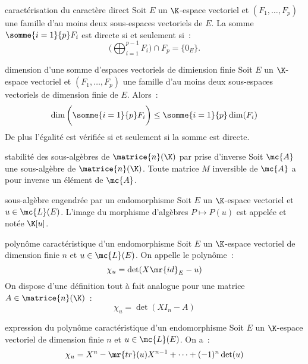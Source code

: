 \begin{adjustwidth}{-3cm}{-3cm}
\begin{proposition}{5.5}{caractérisation du caractère direct}
    Soit $E$ un $\K$-espace vectoriel et $(F_1, \dots , F_p)$ une famille d'au moins deux sous-espaces vectoriels de $E$. La somme $ \displaystyle  \somme{i=1}{p}F_i$ est directe si et seulement si~:
        $$ \bigg( \bigoplus_{i=1}^{p-1} F_i \bigg) \cap F_p = \{0_E\}.$$
\end{proposition}

\begin{proposition}{5.9}{dimension d'une somme d'espaces vectoriels de dimiension finie}
    Soit $E$ un $\K$-espace vectoriel et $(F_1, \dots , F_p)$ une famille d'au moins deux sous-espaces vectoriels de dimension finie de $E$. Alors~:
    $$\dim\bigg(\somme{i=1}{p}F_i\bigg) \leq \somme{i=1}{p}\dim(F_i)$$
De plus l’égalité est vérifiée si et seulement si la somme est directe.
\end{proposition}

\begin{proposition}{5.38}{stabilité des sous-algèbres de $\matrice{n}(\K)$ par prise d'inverse}
    Soit $\mc{A}$ une sous-algèbre de $\matrice{n}(\K)$. Toute matrice $M$ inversible de $\mc{A}$ a pour inverse un élément de $\mc{A}$.
\end{proposition}

\begin{definition}{5.41}{sous-algèbre engendrée par un endomorphisme}
    Soit $E$ un $\K$-espace vectoriel et $u \in \mc{L}(E)$. L'image du morphisme d'algèbres $P \mapsto P(u)$ est appelée  et notée $\K[u]$.
\end{definition}

\begin{definition}{5.42}{polynôme caractéristique d'un endomorphisme}
    Soit $E$ un $\K$-espace vectoriel de dimension finie $n$ et $u \in \mc{L}(E)$. On appelle  le polynôme~:
    $$\chi_u = \det(X \mr{id}_E - u)$$
    On dispose d'une définition tout à fait analogue pour une matrice $A \in \matrice{n}(\K)$~:
    $$\chi_u = \det(X I_n - A)$$
\end{definition}

\begin{proposition}{5.44}{expression du polynôme caractéristique d'un endomorphisme}
    Soit $E$ un $\K$-espace vectoriel de dimension finie $n$ et $u \in \mc{L}(E)$. On a~:
    $$\chi_u = X^n - \mr{tr}(u)X^{n-1} + \dots + (-1)^n\det(u)$$
    

\end{proposition}
\end{adjustwidth}
